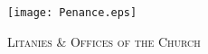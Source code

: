 \fancyhead[RE,LO]{}\fancyhead[RO,LE]{}
\fancyhead[C]{}
\thispagestyle{empty}
{}
  \begin{center}
   \texttt{[image: Penance.eps]}
   \par
   \vspace{2ex}
   	\textsc{\Huge{Litanies \& Offices of the Church}}
   \end{center}